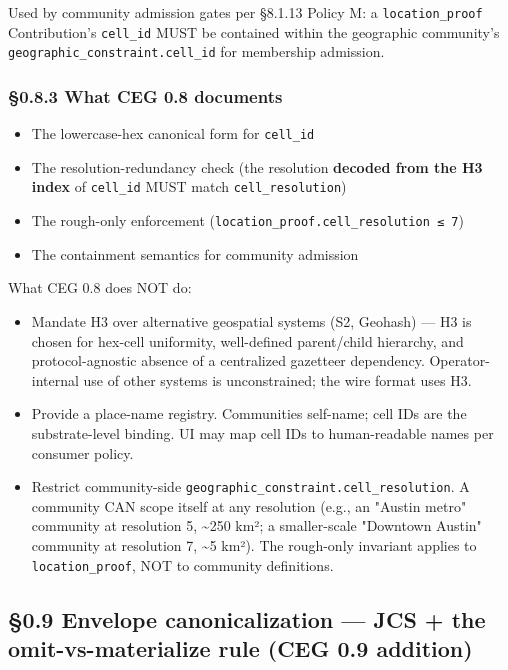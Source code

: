 \documentclass[10pt]{article}
\begin{document}
Used by community admission gates per §8.1.13 Policy M: a \texttt{location\_proof} Contribution's \texttt{cell\_id} MUST be contained within the geographic community's \texttt{geographic\_constraint.cell\_id} for membership admission.


\subsubsection*{§0.8.3 What CEG 0.8 documents}


\begin{itemize}\setlength\itemsep{0pt}
\item The lowercase-hex canonical form for \texttt{cell\_id}
\item The resolution-redundancy check (the resolution \textbf{decoded from the H3 index} of \texttt{cell\_id} MUST match \texttt{cell\_resolution})
\item The rough-only enforcement (\texttt{location\_proof.cell\_resolution ≤ 7})
\item The containment semantics for community admission
\end{itemize}


What CEG 0.8 does NOT do:

\begin{itemize}\setlength\itemsep{0pt}
\item Mandate H3 over alternative geospatial systems (S2, Geohash) — H3 is chosen for hex-cell uniformity, well-defined parent/child hierarchy, and protocol-agnostic absence of a centralized gazetteer dependency. Operator-internal use of other systems is unconstrained; the wire format uses H3.
\item Provide a place-name registry. Communities self-name; cell IDs are the substrate-level binding. UI may map cell IDs to human-readable names per consumer policy.
\item Restrict community-side \texttt{geographic\_constraint.cell\_resolution}. A community CAN scope itself at any resolution (e.g., an "Austin metro" community at resolution 5, \textasciitilde{}250 km²; a smaller-scale "Downtown Austin" community at resolution 7, \textasciitilde{}5 km²). The rough-only invariant applies to \texttt{location\_proof}, NOT to community definitions.
\end{itemize}



\subsection*{§0.9 Envelope canonicalization — JCS + the omit-vs-materialize rule (CEG 0.9 addition)}
\end{document}
